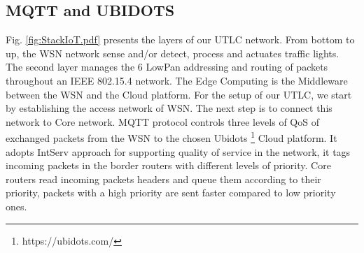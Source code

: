 





\subsection{MQTT and UBIDOTS} \label{Sec:MQTT}

Fig. \ref{fig:StackIoT.pdf} presents the layers of our UTLC network. From bottom to up, the WSN network sense and/or detect, process and actuates traffic lights. The second layer manages the 6 LowPan addressing and routing of packets throughout an IEEE 802.15.4 network. The Edge Computing is the Middleware between the WSN and the Cloud platform.  For the setup of our UTLC, we start by establishing the access network of WSN. The next step is to connect this network to Core network. MQTT protocol controls three levels of QoS of exchanged packets from the WSN to the chosen Ubidots \footnote{https://ubidots.com/} Cloud platform. It adopts IntServ approach for supporting quality of service in the network, it tags incoming packets in the border routers with different levels of priority. Core routers read incoming packets headers and queue them according to their priority, packets with a high priority are sent faster compared to low priority ones.

